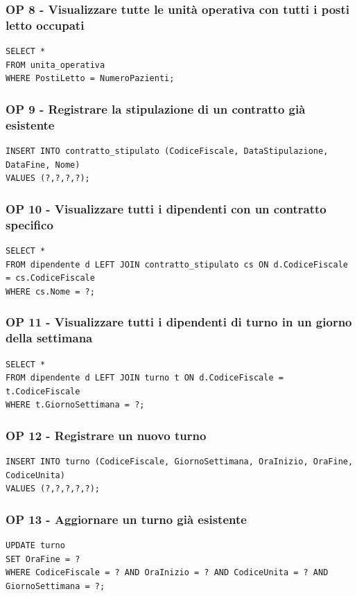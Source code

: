 \documentclass[a4paper, 12pt]{report}
\begin{document}
\subsubsection*{OP 8 - Visualizzare tutte le unità operativa con tutti i posti letto occupati}
\begin{lstlisting}[breaklines=true]
SELECT *
FROM unita_operativa
WHERE PostiLetto = NumeroPazienti;
\end{lstlisting}

\subsubsection*{OP 9 - Registrare la stipulazione di un contratto già esistente}
\begin{lstlisting}[breaklines=true]
INSERT INTO contratto_stipulato (CodiceFiscale, DataStipulazione, DataFine, Nome)
VALUES (?,?,?,?);
\end{lstlisting}

\subsubsection*{OP 10 - Visualizzare tutti i dipendenti con un contratto specifico}
\begin{lstlisting}[breaklines=true]
SELECT *
FROM dipendente d LEFT JOIN contratto_stipulato cs ON d.CodiceFiscale = cs.CodiceFiscale
WHERE cs.Nome = ?;
\end{lstlisting}

\subsubsection*{OP 11 - Visualizzare tutti i dipendenti di turno in un giorno della settimana}
\begin{lstlisting}[breaklines=true]
SELECT *
FROM dipendente d LEFT JOIN turno t ON d.CodiceFiscale = t.CodiceFiscale
WHERE t.GiornoSettimana = ?;
\end{lstlisting}

\subsubsection*{OP 12 - Registrare un nuovo turno}
\begin{lstlisting}[breaklines=true]
INSERT INTO turno (CodiceFiscale, GiornoSettimana, OraInizio, OraFine, CodiceUnita) 
VALUES (?,?,?,?,?);
\end{lstlisting}

\subsubsection*{OP 13 - Aggiornare un turno già esistente}
\begin{lstlisting}[breaklines=true]
UPDATE turno 
SET OraFine = ? 
WHERE CodiceFiscale = ? AND OraInizio = ? AND CodiceUnita = ? AND GiornoSettimana = ?;
\end{lstlisting}
\end{document}
